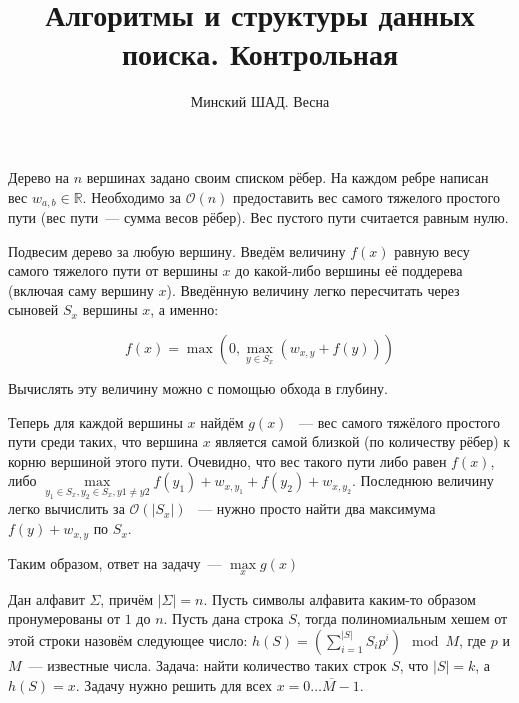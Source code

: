 \documentclass[addpoints]{exam}
\title{Алгоритмы и структуры данных поиска. Контрольная}
\author{Минский ШАД. Весна}
\begin{document}
\maketitle

\begin{questions}

\question[2] Дерево на $n$ вершинах задано своим списком рёбер. На каждом ребре написан вес ${w_{a,b} \in \mathbb{R}}$. Необходимо за $\mathcal{O}(n)$ предоставить вес самого тяжелого простого пути (вес пути~--- сумма весов рёбер). Вес пустого пути считается равным нулю. 

\begin{solution}
Подвесим дерево за любую вершину. Введём величину $f(x)$ равную весу самого тяжелого пути от вершины $x$ до какой-либо вершины её поддерева (включая саму вершину $x$). Введённую величину легко пересчитать через сыновей $S_x$ вершины $x$, а именно: 

$$f(x) = \max\left(0, \max_{y \in S_x}(w_{x,y} + f(y))\right)$$

Вычислять эту величину можно с помощью обхода в глубину.

Теперь для каждой вершины $x$ найдём $g(x)$ ~--- вес самого тяжёлого простого пути среди таких, что вершина $x$ является самой близкой (по количеству рёбер) к корню вершиной этого пути. Очевидно, что вес такого пути либо равен $f(x)$, либо $\max\limits_{y_1 \in S_x, y_2 \in S_x, y1 \neq y2} f(y_1) + w_{x, y_1} + f(y_2) + w_{x, y_2}$. Последнюю величину легко вычислить за $\mathcal{O}(|S_x|)$ ~--- нужно просто найти два максимума $f(y) + w_{x, y}$ по $S_x$. 

Таким образом, ответ на задачу~--- $\max\limits_x g(x)$

\end{solution}

\question Дан алфавит $\Sigma$, причём $|\Sigma| = n$. Пусть символы алфавита каким-то образом пронумерованы от $1$ до $n$. Пусть дана строка $S$, тогда полиномиальным хешем от этой строки назовём следующее число: $h(S) = \left(\sum\limits_{i=1}^{|S|} S_i p^i\right) \mod M$, где $p$ и $M$~--- известные числа. Задача: найти количество таких строк $S$, что $|S| = k$, а $h(S) = x$. Задачу нужно решить для всех $x=\overline{0\ldots M-1}$.

\end{questions}
\end{document}
